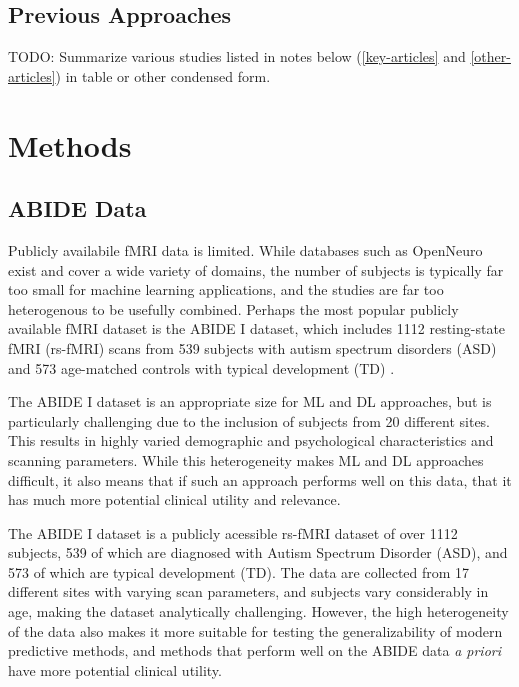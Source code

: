 \documentclass[10pt]{article}
\begin{document}
\subsection{Previous Approaches}

TODO: Summarize various studies listed in notes below (\ref{key-articles} and \ref{other-articles})
in table or other condensed form.



\section{Methods}

\subsection{ABIDE Data}

Publicly availabile fMRI data is limited. While databases such as OpenNeuro
\citep{markiewiczOpenNeuroOpenResource2021} exist and cover a wide variety of domains, the number
of subjects is typically far too small for machine learning applications, and the studies are far
too heterogenous to be usefully combined. Perhaps the most popular publicly available fMRI dataset
is the ABIDE I dataset, which includes 1112 resting-state fMRI (rs-fMRI) scans from 539 subjects
with autism spectrum disorders (ASD) and 573 age-matched controls with typical development (TD)
\citep{dimartinoAutismBrainImaging2014}.

The ABIDE I dataset is an appropriate size for ML and DL approaches, but is particularly challenging
due to the inclusion of subjects from 20 different sites. This results in highly varied demographic
and psychological characteristics and scanning parameters. While this heterogeneity makes ML and DL
approaches difficult, it also means that if such an approach performs well on this data, that it has
much more potential clinical utility and relevance.


The ABIDE I dataset \citep{dimartinoAutismBrainImaging2014} is a publicly acessible rs-fMRI dataset of over
1112 subjects, 539 of which are diagnosed with Autism Spectrum Disorder (ASD),
and 573 of which are typical development (TD). The data are collected from 17 different sites with
varying scan parameters, and subjects vary considerably in age, making the dataset analytically
challenging. However, the high heterogeneity of the data also makes it more suitable for testing the
generalizability of modern predictive methods, and methods that perform well on the ABIDE data
\emph{a priori} have more potential clinical utility.
\end{document}
